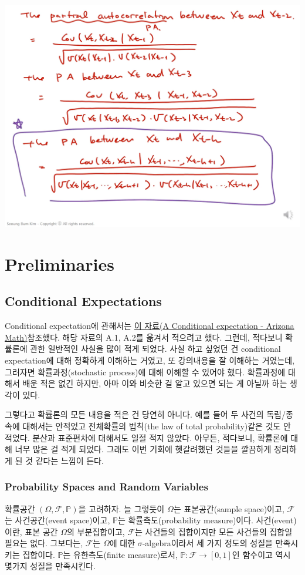 \documentclass{article}
\begin{document}
\begin{center}
\includegraphics[width=.45\textwidth]{capture_12}
\end{center}

\section{Preliminaries}

\subsection{Conditional Expectations}

Conditional expectation에 관해서는 \href{https://www.math.arizona.edu/~tgk/464_07/cond_exp.pdf}{이 자료(A Conditional expectation - Arizona Math)}참조했다.
해당 자료의 A.1, A.2를 옮겨서 적으려고 했다.
그런데, 적다보니 확률론에 관한 일반적인 사실을 많이 적게 되었다.
사실 하고 싶었던 건 conditional expectation에 대해 정확하게 이해하는 거였고, 또 강의내용을 잘 이해하는 거였는데, 그러자면 확률과정(stochastic process)에 대해 이해할 수 있어야 했다.
확률과정에 대해서 배운 적은 없긴 하지만, 아마 이와 비슷한 걸 알고 있으면 되는 게 아닐까 하는 생각이 있다.

그렇다고 확률론의 모든 내용을 적은 건 당연히 아니다.
예를 들어 두 사건의 독립/종속에 대해서는 안적었고 전체확률의 법칙(the law of total probability)같은 것도 안 적었다.
분산과 표준편차에 대해서도 일절 적지 않았다.
아무튼, 적다보니, 확률론에 대해 너무 많은 걸 적게 되었다.
그래도 이번 기회에 헷갈려했던 것들을 깔끔하게 정리하게 된 것 같다는 느낌이 든다.

%
\subsubsection{Probability Spaces and Random Variables}
확률공간 \((\Omega,\mathcal F,\mathbb P)\)을 고려하자.
늘 그렇듯이 \(\Omega\)는 표본공간(sample space)이고, \(\mathcal F\)는 사건공간(event space)이고, \(\mathbb P\)는 확률측도(probability measure)이다.
사건(event)이란, 표본 공간 \(\Omega\)의 부분집합이고, \(\mathcal F\)는 사건들의 집합이지만 모든 사건들의 집합일 필요는 없다. 그보다는, \(\mathcal F\)는 \(\Omega\)에 대한 \(\sigma\)-algebra이라서 세 가지 정도의 성질을 만족시키는 집합이다.
\(\mathbb P\)는 유한측도(finite measure)로서, \(\mathbb P:\mathcal F\to[0,1]\)인 함수이고 역시 몇가지 성질을 만족시킨다.
\end{document}
